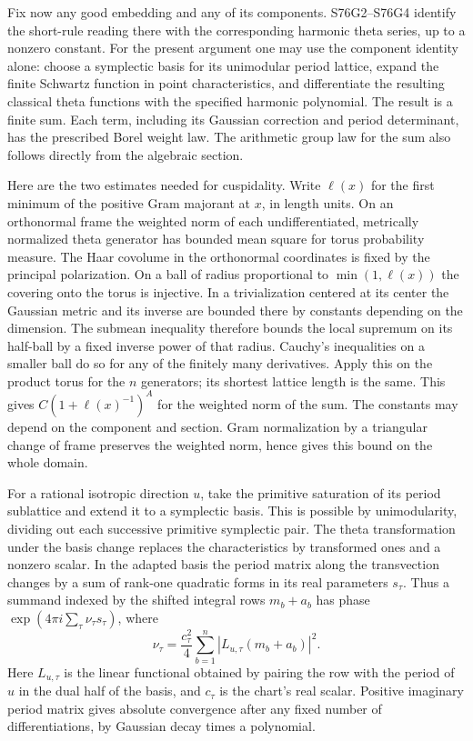 Fix now any good embedding and any of its components. S76G2--S76G4
identify the short-rule reading there with the corresponding
harmonic theta series, up to a nonzero constant. For the present
argument one may use the component identity alone: choose a
symplectic basis for its unimodular period lattice, expand the
finite Schwartz function in point characteristics, and differentiate
the resulting classical theta functions with the specified harmonic
polynomial. The result is a finite sum. Each term, including its
Gaussian correction and period determinant, has the prescribed
Borel weight law. The arithmetic group law for the sum also follows
directly from the algebraic section.

Here are the two estimates needed for cuspidality. Write
$\ell(x)$ for the first minimum of the positive Gram majorant at
$x$, in length units. On an orthonormal frame the weighted norm of
each undifferentiated, metrically normalized theta generator has
bounded mean square for torus probability measure. The Haar
covolume in the orthonormal coordinates is fixed by the principal
polarization. On a ball of radius proportional to
$\min(1,\ell(x))$ the covering onto the torus is injective.
In a trivialization centered at its center the Gaussian metric
and its inverse are bounded there by constants depending on the
dimension. The submean inequality therefore bounds the local
supremum on its half-ball by a fixed inverse power of that radius.
Cauchy's inequalities on a smaller ball do so for any of the
finitely many derivatives. Apply this on the product torus for
the $n$ generators; its shortest lattice length is the same.
This gives $C(1+\ell(x)^{-1})^A$ for the weighted norm of the
sum. The constants may depend on the component and section.
Gram normalization by a triangular change of frame preserves
the weighted norm, hence gives this bound on the whole domain.

For a rational isotropic direction $u$, take the primitive
saturation of its period sublattice and extend it to a symplectic
basis. This is possible by unimodularity, dividing out each
successive primitive symplectic pair. The theta transformation under
the basis change replaces the characteristics by transformed ones
and a nonzero scalar. In the adapted basis the period matrix along
the transvection changes by a sum of rank-one quadratic forms in
its real parameters $s_\tau$. Thus a summand indexed by the
shifted integral rows $m_b+a_b$ has phase
$\exp(4\pi i\sum_\tau \nu_\tau s_\tau)$, where
\[
 \nu_\tau=\frac{c_\tau^2}{4}
       \sum_{b=1}^n |L_{u,\tau}(m_b+a_b)|^2 .
\]
Here $L_{u,\tau}$ is the linear functional obtained by pairing
the row with the period of $u$ in the dual half of the basis,
and $c_\tau$ is the chart's real scalar. Positive imaginary
period matrix gives absolute convergence after any fixed number
of differentiations, by Gaussian decay times a polynomial.

